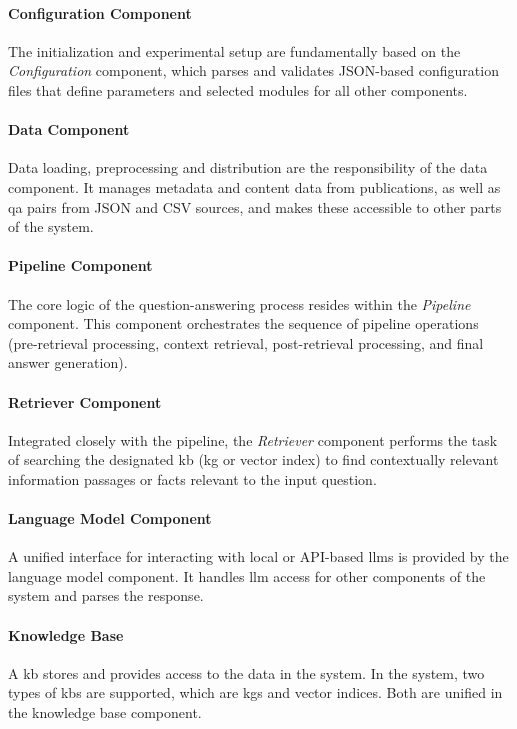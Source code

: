 \paragraph{Configuration Component}
The initialization and experimental setup are fundamentally based on the \emph{Configuration} component, which parses and validates JSON-based configuration files that define parameters and selected modules for all other components.

\paragraph{Data Component}
Data loading, preprocessing and distribution are the responsibility of the data component. It manages metadata and content data from publications, as well as \gls{qa} pairs from JSON and CSV sources, and makes these accessible to other parts of the system.

\paragraph{Pipeline Component}
The core logic of the question-answering process resides within the \emph{Pipeline} component. This component orchestrates the sequence of pipeline operations (pre-retrieval processing, context retrieval, post-retrieval processing, and final answer generation). 

\paragraph{Retriever Component}
Integrated closely with the pipeline, the \emph{Retriever} component performs the task of searching the designated \gls{kb} (\gls{kg} or vector index) to find contextually relevant information passages or facts relevant to the input question.

\paragraph{Language Model Component}
A unified interface for interacting with local or API-based \glspl{llm} is provided by the language model component. It handles \gls{llm} access for other components of the system and parses the response.

\paragraph{Knowledge Base}
A \gls{kb} stores and provides access to the data in the system. In the system, two types of \glspl{kb} are supported, which are \glspl{kg} and vector indices. Both are unified in the knowledge base component.

